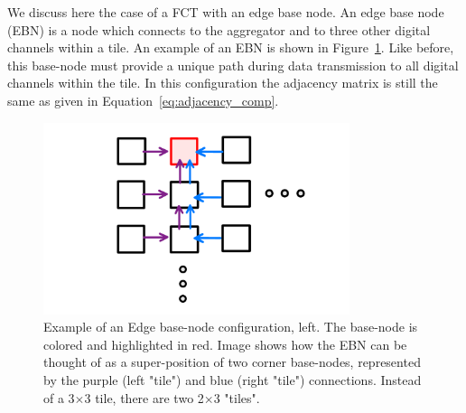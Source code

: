 We discuss here the case of a FCT with an edge base node.
An edge base node (EBN) is a node which connects to the aggregator and to three other digital channels within a tile.
An example of an EBN is shown in Figure~\ref{fig:ebn}.
Like before, this base-node must provide a unique path during data transmission to all digital channels within the tile.
In this configuration the adjacency matrix is still the same as given in Equation~\ref{eq:adjacency_comp}.

\begin{figure}[]
\centering
\includegraphics[width=0.8\textwidth]{images/EBN_superposition.pdf}
\caption{Example of an Edge base-node configuration, left.
The base-node is colored and highlighted in red.
Image shows how the EBN can be thought of as a super-position of two corner base-nodes, represented by the purple (left "tile") and blue (right "tile") connections.
Instead of a 3$\times$3 tile, there are two 2$\times$3 "tiles".
}
\label{fig:ebn}
\end{figure}
